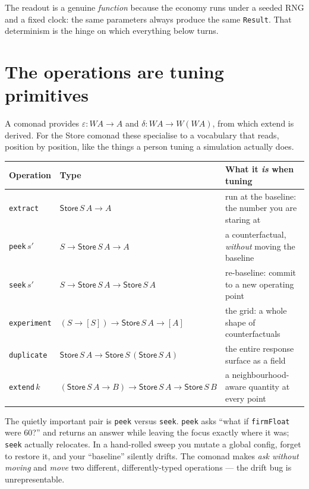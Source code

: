 \documentclass[11pt]{article}
\newcommand{\Store}{\mathsf{Store}}
\newcommand{\extract}{\varepsilon}
\newcommand{\duplicate}{\delta}
\begin{document}
\noindent The readout is a genuine \emph{function} because the economy runs under
a seeded RNG and a fixed clock: the same parameters always produce the same
\texttt{Result}. That determinism is the hinge on which everything below turns.

\section{The operations are tuning primitives}

A comonad provides $\extract : W A \to A$ and $\duplicate : W A \to W(W A)$,
from which $\mathrm{extend}$ is derived. For the Store comonad these specialise
to a vocabulary that reads, position by position, like the things a person
tuning a simulation actually does.

\begin{center}
\begin{tabular}{@{}l l p{5.4cm}@{}}
\toprule
Operation & Type & What it \emph{is} when tuning \\
\midrule
\texttt{extract} & $\Store\,S\,A \to A$ & run at the baseline: the number you are staring at \\
\texttt{peek}\,$s'$ & $S \to \Store\,S\,A \to A$ & a counterfactual, \emph{without} moving the baseline \\
\texttt{seek}\,$s'$ & $S \to \Store\,S\,A \to \Store\,S\,A$ & re-baseline: commit to a new operating point \\
\texttt{experiment} & $(S \to [S]) \to \Store\,S\,A \to [A]$ & the grid: a whole shape of counterfactuals \\
\texttt{duplicate} & $\Store\,S\,A \to \Store\,S\,(\Store\,S\,A)$ & the entire response surface as a field \\
\texttt{extend}\,$k$ & $(\Store\,S\,A \to B) \to \Store\,S\,A \to \Store\,S\,B$ & a neighbourhood-aware quantity at every point \\
\bottomrule
\end{tabular}
\end{center}

\noindent The quietly important pair is \texttt{peek} versus \texttt{seek}.
\texttt{peek} asks ``what if \texttt{firmFloat} were $60$?'' and returns an
answer while leaving the focus exactly where it was; \texttt{seek} actually
relocates. In a hand-rolled sweep you mutate a global config, forget to restore
it, and your ``baseline'' silently drifts. The comonad makes \emph{ask without
moving} and \emph{move} two different, differently-typed operations --- the drift
bug is unrepresentable.
\end{document}
